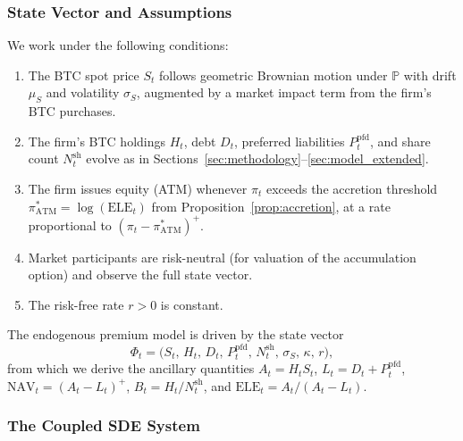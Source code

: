 \subsubsection{State Vector and Assumptions}

\begin{assumption}\label{ass:endo_env}
We work under the following conditions:
\begin{enumerate}
  \item The BTC spot price $S_t$ follows geometric Brownian motion under
    $\mathbb{P}$ with drift $\mu_S$ and volatility $\sigma_S$, augmented by
    a market impact term from the firm's BTC purchases.
  \item The firm's BTC holdings $H_t$, debt $D_t$, preferred liabilities
    $P_t^{\mathrm{pfd}}$, and share count $N_t^{\mathrm{sh}}$ evolve as in
    Sections~\ref{sec:methodology}--\ref{sec:model_extended}.
  \item The firm issues equity (ATM) whenever $\pi_t$ exceeds the accretion
    threshold $\pi^*_{\mathrm{ATM}} = \log(\mathrm{ELE}_t)$ from
    Proposition~\ref{prop:accretion}, at a rate proportional to
    $(\pi_t - \pi^*_{\mathrm{ATM}})^+$.
  \item Market participants are risk-neutral (for valuation of the
    accumulation option) and observe the full state vector.
  \item The risk-free rate $r > 0$ is constant.
\end{enumerate}
\end{assumption}

\begin{definition}\label{def:state_vector}
The endogenous premium model is driven by the state vector
\begin{equation}\label{eq:state_vector}
  \Phi_t = \bigl(S_t,\, H_t,\, D_t,\, P_t^{\mathrm{pfd}},\,
  N_t^{\mathrm{sh}},\, \sigma_S,\, \kappa,\, r\bigr),
\end{equation}
from which we derive the ancillary quantities $A_t = H_t S_t$,
$L_t = D_t + P_t^{\mathrm{pfd}}$, $\mathrm{NAV}_t = (A_t - L_t)^+$,
$B_t = H_t / N_t^{\mathrm{sh}}$, and
$\mathrm{ELE}_t = A_t / (A_t - L_t)$.
\end{definition}

\subsubsection{The Coupled SDE System}


